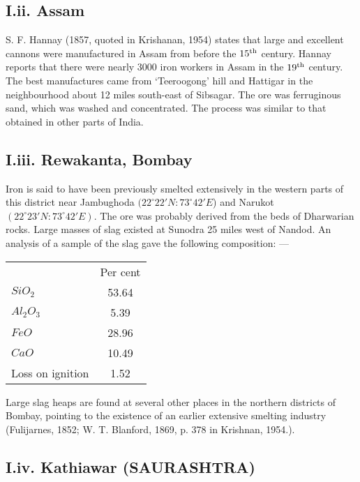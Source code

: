 \subsection*{I.ii. Assam}\label{subsection-2}

S. F. Hannay (1857, quoted in Krishanan, 1954) states that large and excellent cannons were manufactured in Assam from before the $15^{\rm th}$ century. Hannay reports that there were nearly 3000 iron workers in Assam in the $19^{\rm th}$ century. The best manufactures came from ‘Teeroogong’ hill and Hattigar in the neighbourhood about 12 miles south-east of Sibsagar. The ore was ferruginous sand, which was washed and concentrated. The process was similar to that obtained in other parts of India.

\subsection*{I.iii. Rewakanta, Bombay}\label{subsection-3}

Iron is said to have been previously smelted extensively in the western parts of this district near Jambughoda $(22^\circ 22'N: 73^\circ 42'E$) and Narukot $(22^\circ 23' N: 73^\circ 42' E)$. The ore was probably derived from the beds of Dharwarian rocks. Large masses of slag existed at Sunodra 25 miles west of Nandod. An analysis of a sample of the slag gave the following composition: —

\begin{center}
\begin{tabular}{lc}
& Per cent\\
$SiO_2$ & 53.64\\
$Al_2O_3$ & 5.39 \\
$FeO$ & 28.96\\
$CaO$ & 10.49\\
Loss on ignition & 1.52
\end{tabular}
\end{center}

Large slag heaps are found at several other places in the northern districts of Bombay, pointing to the existence of an earlier extensive smelting industry (Fulijarnes, 1852; W. T. Blanford, 1869, p. 378 in Krishnan, 1954.).

\subsection*{I.iv.  Kathiawar (SAURASHTRA)}\label{subsection-4}


